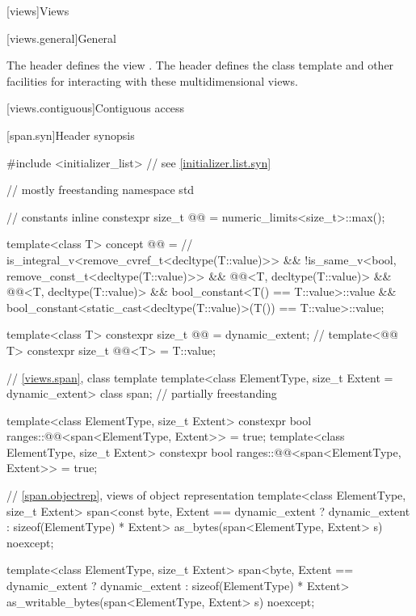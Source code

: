 [views]{Views}

[views.general]{General}

\pnum
The header  defines the view .
The header  defines the class template  and
other facilities for interacting with these multidimensional views.

[views.contiguous]{Contiguous access}

[span.syn]{Header  synopsis}%

%
\begin{codeblock}
#include <initializer_list>     // see \ref{initializer.list.syn}

// mostly freestanding
namespace std {
  // constants
  inline constexpr size_t @@ = numeric_limits<size_t>::max();

  template<class T>
    concept @@ =                    // \expos
      is_integral_v<remove_cvref_t<decltype(T::value)>> &&
      !is_same_v<bool, remove_const_t<decltype(T::value)>> &&
      @@<T, decltype(T::value)> &&
      @@<T, decltype(T::value)> &&
      bool_constant<T() == T::value>::value &&
      bool_constant<static_cast<decltype(T::value)>(T()) == T::value>::value;

  template<class T>
    constexpr size_t @@ = dynamic_extent; // \expos
  template<@@ T>
    constexpr size_t @@<T> = {T::value};

  // \ref{views.span}, class template 
  template<class ElementType, size_t Extent = dynamic_extent>
    class span;                                                             // partially freestanding

  template<class ElementType, size_t Extent>
    constexpr bool ranges::@@<span<ElementType, Extent>> = true;
  template<class ElementType, size_t Extent>
    constexpr bool ranges::@@<span<ElementType, Extent>> = true;

  // \ref{span.objectrep}, views of object representation
  template<class ElementType, size_t Extent>
    span<const byte, Extent == dynamic_extent ? dynamic_extent : sizeof(ElementType) * Extent>
      as_bytes(span<ElementType, Extent> s) noexcept;

  template<class ElementType, size_t Extent>
    span<byte, Extent == dynamic_extent ? dynamic_extent : sizeof(ElementType) * Extent>
      as_writable_bytes(span<ElementType, Extent> s) noexcept;
}
\end{codeblock}

